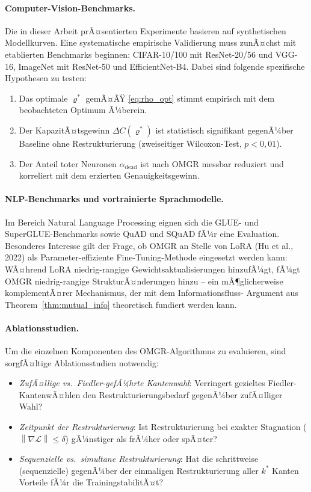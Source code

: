 ﻿\documentclass[12pt, a4paper, openany]{report}
\newcommand{\calL}{\mathcal{L}}
\newcommand{\norms}[1]{\left\|#1\right\|}
\begin{document}
\paragraph{Computer-Vision-Benchmarks.}
Die in dieser Arbeit prÃ¤sentierten Experimente basieren auf synthetischen
Modellkurven.  Eine systematische empirische Validierung muss zunÃ¤chst
mit etablierten Benchmarks beginnen: CIFAR-10/100 mit ResNet-20/56 und
VGG-16, ImageNet mit ResNet-50 und EfficientNet-B4.  Dabei sind folgende
spezifische Hypothesen zu testen:
\begin{enumerate}[label=(\roman*)]
  \item Das optimale $\varrho^*$ gemÃ¤ÃŸ \eqref{eq:rho_opt} stimmt
    empirisch mit dem beobachteten Optimum Ã¼berein.
  \item Der KapazitÃ¤tsgewinn $\Delta C(\varrho^*)$ ist statistisch
    signifikant gegenÃ¼ber Baseline ohne Restrukturierung
    (zweiseitiger Wilcoxon-Test, $p < 0{,}01$).
  \item Der Anteil toter Neuronen $\alpha_{\mathrm{dead}}$ ist nach OMGR
    messbar reduziert und korreliert mit dem erzierten Genauigkeitsgewinn.
\end{enumerate}

\paragraph{NLP-Benchmarks und vortrainierte Sprachmodelle.}
Im Bereich Natural Language Processing eignen sich die GLUE- und
SuperGLUE-Benchmarks sowie QuAD und SQuAD fÃ¼r eine Evaluation.
Besonderes Interesse gilt der Frage, ob OMGR an Stelle von LoRA
(Hu et al., 2022) als Parameter-effiziente Fine-Tuning-Methode
eingesetzt werden kann: WÃ¤hrend LoRA niedrig-rangige Gewichtsaktualisierungen
hinzufÃ¼gt, fÃ¼gt OMGR niedrig-rangige StrukturÃ¤nderungen hinzu -- ein
mÃ¶glicherweise komplementÃ¤rer Mechanismus, der mit dem Informationsfluss-
Argument aus Theorem~\ref{thm:mutual_info} theoretisch fundiert werden kann.

\paragraph{Ablationsstudien.}
Um die einzelnen Komponenten des OMGR-Algorithmus zu evaluieren, sind
sorgfÃ¤ltige Ablationsstudien notwendig:
\begin{itemize}
  \item \emph{ZufÃ¤llige vs.\ Fiedler-gefÃ¼hrte Kantenwahl}: Verringert
    gezieltes Fiedler-KantenwÃ¤hlen den Restrukturierungsbedarf gegenÃ¼ber
    zufÃ¤lliger Wahl?
  \item \emph{Zeitpunkt der Restrukturierung}: Ist Restrukturierung bei
    exakter Stagnation ($\norms{\nabla\calL} \leq \delta$) gÃ¼nstiger als
    frÃ¼her oder spÃ¤ter?
  \item \emph{Sequenzielle vs.\ simultane Restrukturierung}: Hat die
    schrittweise (sequenzielle) gegenÃ¼ber der einmaligen Restrukturierung
    aller $k^*$ Kanten Vorteile fÃ¼r die TrainingstabilitÃ¤t?
\end{itemize}
\end{document}
